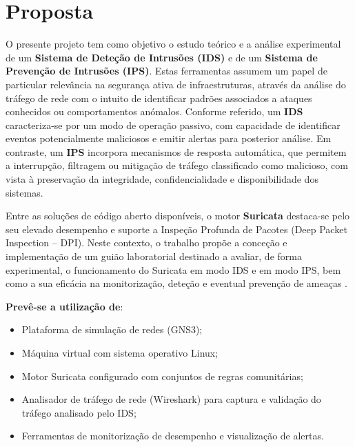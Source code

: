 
\chapter{Proposta}

O presente projeto tem como objetivo o estudo teórico e a análise experimental de um \textbf{Sistema de Deteção de Intrusões (IDS)} e de um \textbf{Sistema de Prevenção de Intrusões (IPS)}. Estas ferramentas assumem um papel de particular relevância na segurança ativa de infraestruturas, através da análise do tráfego de rede com o intuito de identificar padrões associados a ataques conhecidos ou comportamentos anómalos. Conforme referido, um \textbf{IDS} caracteriza-se por um modo de operação passivo, com capacidade de identificar eventos potencialmente maliciosos e emitir alertas para posterior análise. Em contraste, um \textbf{IPS} incorpora mecanismos de resposta automática, que permitem a interrupção, filtragem ou mitigação de tráfego classificado como malicioso, com vista à preservação da integridade, confidencialidade e disponibilidade dos sistemas.

Entre as soluções de código aberto disponíveis, o motor \textbf{Suricata} destaca-se pelo seu elevado desempenho e suporte a Inspeção Profunda de Pacotes (Deep Packet Inspection – DPI). Neste contexto, o trabalho propõe a conceção e implementação de um guião laboratorial destinado a avaliar, de forma experimental, o funcionamento do Suricata em modo IDS e em modo IPS, bem como a sua eficácia na monitorização, deteção e eventual prevenção de ameaças \cite{suricata}.

\textbf{Prevê-se a utilização de}:

\begin{itemize}
    \item Plataforma de simulação de redes (GNS3);
    \item Máquina virtual com sistema operativo Linux;
    \item Motor Suricata configurado com conjuntos de regras comunitárias;
    \item Analisador de tráfego de rede (Wireshark) para captura e validação do tráfego analisado pelo IDS;
    \item Ferramentas de monitorização de desempenho e visualização de alertas.
\end{itemize}

